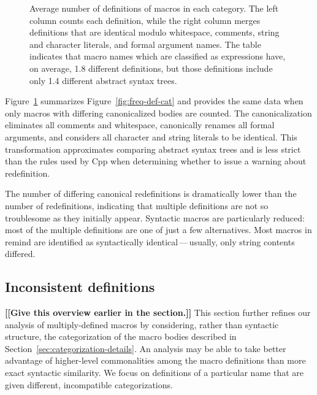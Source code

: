 \documentclass[10pt]{article}
\newcommand{\comment}[1]{\textbf{[[#1]]}}
\newcommand{\pkg}[1]{\textsf{#1}}
\newcommand{\captionsmall}[1]{\caption[]{\small #1}}
\begin{document}
\begin{figure}
  {\small\centerline{}}
  
  \captionsmall{Average number of definitions of macros in each category.
    The left column counts each definition, while the right column merges
    definitions that are identical modulo whitespace, comments, string and
    character literals, and formal argument names.  The table indicates
    that macro names which are classified as expressions have, on average,
    1.8 different definitions, but those definitions include only 1.4
    different abstract syntax trees.}
  \label{fig:freq-sum-cat}
\end{figure}


Figure~\ref{fig:freq-sum-cat} summarizes Figure~\ref{fig:freq-def-cat} and
provides the same data when only macros with differing canonicalized bodies
are counted.  The canonicalization eliminates all comments and whitespace,
canonically renames all formal arguments, and considers all character and
string literals to be identical.  This transformation approximates comparing
abstract syntax trees and is less strict than the rules used by Cpp when
determining whether to issue a warning about redefinition.

The number of differing canonical redefinitions is dramatically lower than
the number of redefinitions, indicating that multiple definitions are not
so troublesome as they initially appear.  Syntactic macros are particularly
reduced: most of the multiple definitions are one of just a few
alternatives.  Most macros in \pkg{remind} are identified as syntactically
identical\,---\,usually, only string contents differed.


\subsection{Inconsistent definitions}
\label{sec:inconsistent}


\comment{Give this overview earlier in the section.}
This section further refines our analysis of multiply-defined macros by
considering, rather than syntactic structure, the categorization of the
macro bodies described in Section~\ref{sec:categorization-details}.  An
analysis may be able to take better advantage of higher-level commonalities
among the macro definitions than more exact syntactic similarity.  We focus
on definitions of a particular name that are given different, incompatible
categorizations.
\end{document}
